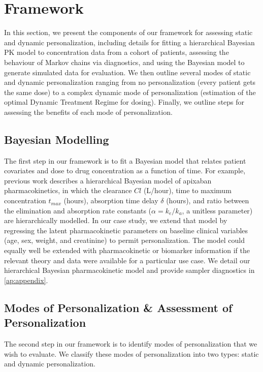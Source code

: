 \section{Framework}\label{ss:framework}

In this section, we present the components of our framework for assessing static and dynamic personalization, including details for fitting a hierarchical Bayesian PK model to concentration data from a cohort of patients, assessing the behaviour of Markov chains via diagnostics, and using the Bayesian model to generate simulated data for evaluation. We then outline several modes of static and dynamic personalization ranging from no personalization (every patient gets the same dose) to a complex dynamic mode of personalization (estimation of the optimal Dynamic Treatment Regime for dosing).  Finally, we outline steps for assessing the benefits of each mode of personalization.

\subsection{Bayesian Modelling}

The first step in our framework is to fit a Bayesian model that relates patient covariates and dose to drug concentration as a function of time. For example, previous work \cite{pananos2020comparisons} describes a hierarchical Bayesian model of apixaban pharmacokinetics, in which the clearance $\mathit{Cl}$ (L/hour), time to maximum concentration $t_{max}$ (hours), absorption time delay $\delta$ (hours), and ratio between the elimination and absorption rate constants ($\alpha = k_e/k_a$, a unitless parameter) are hierarchically modelled. In our case study, we extend that model by regressing the latent pharmacokinetic parameters on baseline clinical variables (age, sex, weight, and creatinine) to permit personalization. The model could equally well be extended with pharmacokinetic or biomarker information if the relevant theory and data were available for a particular use case. We detail our hierarchical Bayesian pharmacokinetic model and provide sampler diagnostics in \cref{ap:appendix}.


\subsection{Modes of Personalization \& Assessment of Personalization}

The second step in our framework is to identify modes of personalization that we wish to evaluate. We classify these modes of personalization into two types: static and dynamic personalization.


